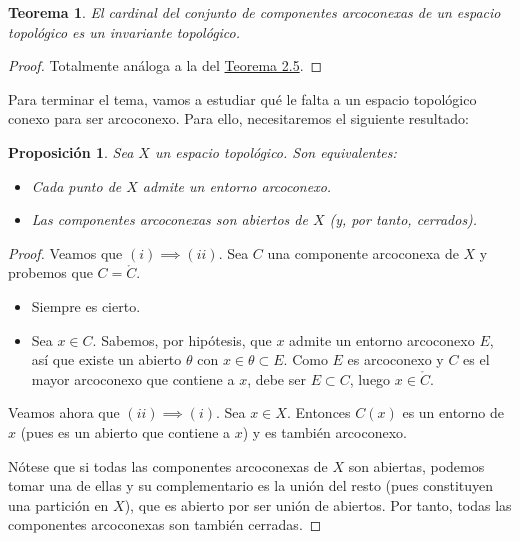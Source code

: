 \documentclass[12pt]{report}
\newtheorem{proposition}{Proposición}[chapter]
\newtheorem{theorem}{Teorema}[chapter]
\theoremstyle{definition}
\theoremstyle{definition}
\theoremstyle{remark}
\begin{document}
\vspace{2mm}
\begin{theorem}
El cardinal del conjunto de componentes arcoconexas de un espacio topológico es un invariante topológico.
\end{theorem}

\begin{proof}
Totalmente análoga a la del \hyperref[teo2.5.]{\color{blue}Teorema 2.5}.
\end{proof}

\vspace{5mm}
Para terminar el tema, vamos a estudiar qué le falta a un espacio topológico conexo para ser arcoconexo. Para ello, necesitaremos el siguiente resultado:

\begin{proposition}
Sea $X$  un espacio topológico. Son equivalentes:
\begin{itemize}
    \item[(i)] Cada punto de $X$ admite un entorno arcoconexo.
    \item[(ii)] Las componentes arcoconexas son abiertos de $X$ (y, por tanto, cerrados).
\end{itemize}
\end{proposition}

\begin{proof}
Veamos que $(i) \implies (ii)$. Sea $C$ una componente arcoconexa de $X$ y probemos que $C = \mathring{C}$.
\begin{itemize}
    \item[{\fbox[rb]{$\subset$}}] Siempre es cierto.
    \item[{\fbox[rb]{$\supset$}}] Sea $x \in C$. Sabemos, por hipótesis, que $x$ admite un entorno arcoconexo $E$, así que existe un abierto $\theta$ con $x \in \theta \subset E$. Como $E$ es arcoconexo y $C$ es el mayor arcoconexo que contiene a $x$, debe ser $E \subset C$, luego $x \in \mathring{C}$.
\end{itemize}

Veamos ahora que $(ii) \implies (i)$. Sea $x \in X$. Entonces $C(x)$ es un entorno de $x$ (pues es un abierto que contiene a $x$) y es también arcoconexo. 

\vspace{2mm}
Nótese que si todas las componentes arcoconexas de $X$ son abiertas, podemos tomar una de ellas y su complementario es la unión del resto (pues constituyen una partición en $X$), que es abierto por ser unión de abiertos. Por tanto, todas las componentes arcoconexas son también cerradas.
\end{proof}
\end{document}
